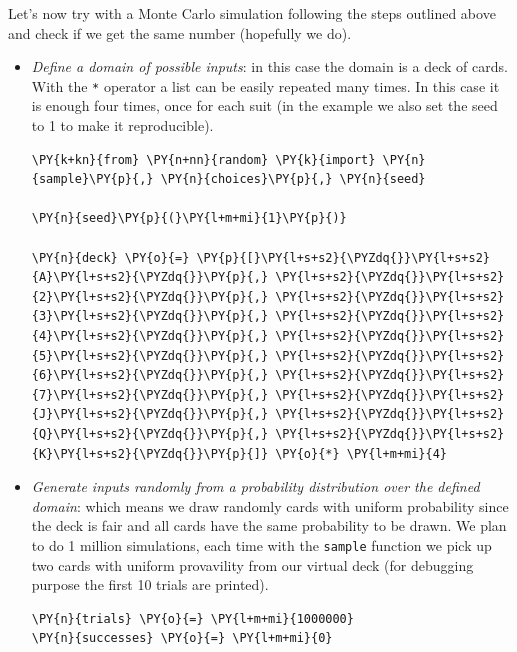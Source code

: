 Let's now try with a Monte Carlo simulation following the steps outlined above and check if we get the same number (hopefully we do).
\begin{itemize}
\item \emph{Define a domain of possible inputs}: in this case the domain is a deck of cards. With the \texttt{*} operator a list can be easily repeated many times. In this case it is enough four times, once for each suit (in the example we also set the seed to 1 to make it reproducible).

\begin{tcolorbox}[breakable, size=fbox, boxrule=1pt, pad at break*=1mm,colback=cellbackground, colframe=cellborder]
\begin{Verbatim}[commandchars=\\\{\}]
\PY{k+kn}{from} \PY{n+nn}{random} \PY{k}{import} \PY{n}{sample}\PY{p}{,} \PY{n}{choices}\PY{p}{,} \PY{n}{seed}

\PY{n}{seed}\PY{p}{(}\PY{l+m+mi}{1}\PY{p}{)}

\PY{n}{deck} \PY{o}{=} \PY{p}{[}\PY{l+s+s2}{\PYZdq{}}\PY{l+s+s2}{A}\PY{l+s+s2}{\PYZdq{}}\PY{p}{,} \PY{l+s+s2}{\PYZdq{}}\PY{l+s+s2}{2}\PY{l+s+s2}{\PYZdq{}}\PY{p}{,} \PY{l+s+s2}{\PYZdq{}}\PY{l+s+s2}{3}\PY{l+s+s2}{\PYZdq{}}\PY{p}{,} \PY{l+s+s2}{\PYZdq{}}\PY{l+s+s2}{4}\PY{l+s+s2}{\PYZdq{}}\PY{p}{,} \PY{l+s+s2}{\PYZdq{}}\PY{l+s+s2}{5}\PY{l+s+s2}{\PYZdq{}}\PY{p}{,} \PY{l+s+s2}{\PYZdq{}}\PY{l+s+s2}{6}\PY{l+s+s2}{\PYZdq{}}\PY{p}{,} \PY{l+s+s2}{\PYZdq{}}\PY{l+s+s2}{7}\PY{l+s+s2}{\PYZdq{}}\PY{p}{,} \PY{l+s+s2}{\PYZdq{}}\PY{l+s+s2}{J}\PY{l+s+s2}{\PYZdq{}}\PY{p}{,} \PY{l+s+s2}{\PYZdq{}}\PY{l+s+s2}{Q}\PY{l+s+s2}{\PYZdq{}}\PY{p}{,} \PY{l+s+s2}{\PYZdq{}}\PY{l+s+s2}{K}\PY{l+s+s2}{\PYZdq{}}\PY{p}{]} \PY{o}{*} \PY{l+m+mi}{4}
 \end{Verbatim}
\end{tcolorbox}

\item \emph{Generate inputs randomly from a probability distribution over the defined domain}: which means we draw randomly cards with uniform probability since the deck is fair and all cards have the same probability to be drawn. 
We plan to do 1 million simulations, each time with the \texttt{sample} function we pick up two cards with uniform provavility from our virtual deck (for debugging purpose the first 10 trials are printed).

\begin{tcolorbox}[breakable, size=fbox, boxrule=1pt, pad at break*=1mm,colback=cellbackground, colframe=cellborder]
\begin{Verbatim}[commandchars=\\\{\}]
\PY{n}{trials} \PY{o}{=} \PY{l+m+mi}{1000000}
\PY{n}{successes} \PY{o}{=} \PY{l+m+mi}{0}


\end{Verbatim}
\end{tcolorbox}
\end{itemize}
